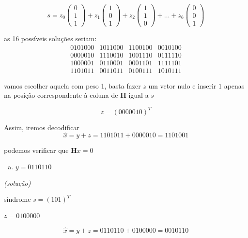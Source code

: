 \begin{frame}[allowframebreaks]
\begin{exercise}
    \begin{equation}
    s = z_0 \begin{pmatrix} 0 \\ 1 \\ 1 \end{pmatrix} + z_1 \begin{pmatrix} 1 \\ 0 \\ 1 \end{pmatrix} + z_2 \begin{pmatrix} 1 \\ 1 \\ 0 \end{pmatrix} + \ldots + z_6 \begin{pmatrix} 0 \\ 0 \\ 1 \end{pmatrix}
    \end{equation}

   
    as 16 possíveis soluções seriam:
        \begin{equation}
        \begin{matrix}
	0101000 & 1011000 & 1100100 & 0010100 \\
	0000010 & 1110010 & 1001110 & 0111110 \\
	1000001 & 0110001 & 0001101 & 1111101 \\
	1101011 & 0011011 & 0100111 & 1010111
        \end{matrix}
        \end{equation}

   \exercisebreak

   vamos escolher aquela com peso 1, basta fazer $z$ um vetor nulo e inserir $1$ apenas 
   na posição correspondente à coluna de $\mathbf{H}$ igual a $s$

  \begin{equation}
  z = (0000010)^T
  \end{equation}

  Assim, iremos decodificar 
  \begin{equation}
  \hat{x} = y + z = 1101011 + 0000010 = 1101001
  \end{equation}

  podemos verificar que $\mathbf{H}x = 0$
  
  \exercisebreak

  \begin{enumerate}[b)]
  \item $y = 0110110$
  \end{enumerate}

  \textit{(solução)}

  síndrome $s = (1 0 1)^T$

  $z = 0100000$ 
 
  \begin{equation}
  \hat{x} = y + z = 0110110 + 0100000 = 0010110
  \end{equation}


  \end{exercise}
\end{frame}


